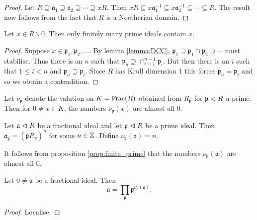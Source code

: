 \documentclass{memoir}
\begin{document}
\begin{proof}
    Let $R\supseteq \mathfrak a_1\supseteq \mathfrak a_2 \supseteq \cdots \supseteq xR$.
    Then $xR \subseteq x\mathfrak a_1^{-1} \subseteq x\mathfrak a_2^{-1} \subseteq \cdots \subseteq R$.
    The result now follows from the fact that $R$ is a Noetherian domain.
\end{proof}
\begin{proposition}
    \label{prop:finite_prime}
    Let $x\in R\backslash 0$. Then only finitely many prime ideals contain $x$.
\end{proposition}
\begin{proof}
    Suppose $x\in \mathfrak p_1, \mathfrak p_2, \dots$.
    By lemma \ref{lemma:DCC}, $\mathfrak p_1\supseteq \mathfrak p_1\cap \mathfrak p_2 \supseteq \cdots$ must stabilise. 
    Thus there is an $n$ such that $\mathfrak p_n \supseteq \cap_{i=1}^{n-1}\mathfrak p_i$.
    But then there is an $i$ such that $1\le i < n$ and $\mathfrak p_n\supseteq \mathfrak p_i$.
    Since $R$ has Krull dimension 1 this forces $\mathfrak p_n = \mathfrak p_i$ and so we obtain a contradition.
\end{proof}
\begin{corollary}
    Let $\nu_{\mathfrak p}$ denote the valution on $K = \text{Frac}(R)$ obtained from $R_{\mathfrak p}$ for $\mathfrak p \vartriangleleft R$ a prime.
    Then for $0\ne x\in K$, the numbers $\nu_{\mathfrak p}(x)$ are almost all $0$.
\end{corollary}
\begin{definition}
    Let $\mathfrak a \vartriangleleft R$ be a fractional ideal and let $\mathfrak p \vartriangleleft R$ be a prime ideal. 
    Then $\mathfrak a_{\mathfrak p} = (\mathfrak p R_{\mathfrak p})^n$ for some $n\in \mathbb{Z}$.
    Define $\nu_{\mathfrak p}(\mathfrak a) = n$.
\end{definition}
\begin{remark}
    It follows from proposition \ref{prop:finite_prime} that the numbers $\nu_{\mathfrak p}(\mathfrak a)$ are almost all $0$.
\end{remark}
\begin{thm}
    Let $0\ne \mathfrak a$ be a fractional ideal.
    Then
    \begin{equation}
        \mathfrak a = \prod_{\mathfrak p}\mathfrak p^{\nu_{\mathfrak p}(\mathfrak a)}.
    \end{equation}
\end{thm}
\begin{proof}
    Localise.
\end{proof}
\end{document}
